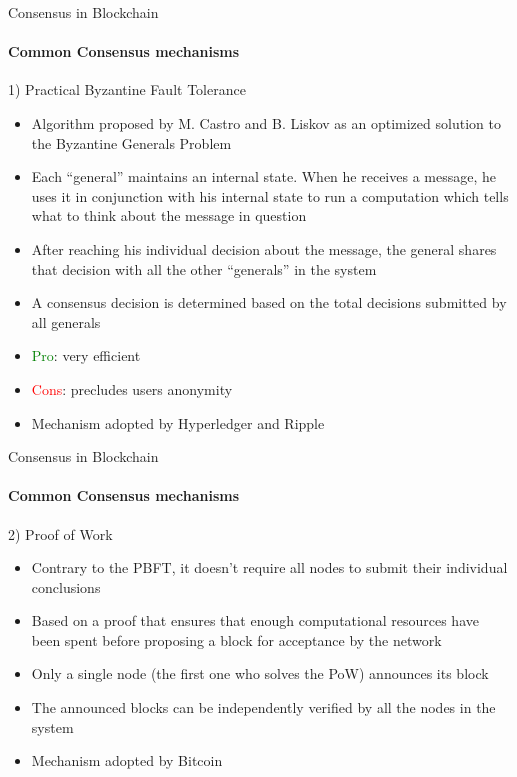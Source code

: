 \documentclass{beamer}
\newcommand\red[1]{\textcolor{red}{#1}}
\begin{document}
  \begin{frame}{Consensus in Blockchain}
    \framesubtitle{Common Consensus mechanisms}
    \begin{block}{1) Practical Byzantine Fault Tolerance}
      \begin{itemize}
        \item Algorithm proposed by M. Castro and B. Liskov as an optimized
        solution to the Byzantine Generals Problem \cite{castro1999practical} 
        \item Each “general” maintains an internal state. When he receives a
        message, he uses it in conjunction with his internal state to
        run a computation which tells what to think about the message in question 
        \item  After reaching his individual decision about the message,
        the general shares that decision with all the other “generals” in the system 
        \item  A consensus decision is determined based on the total decisions
        submitted by all generals \pause
        \item \textcolor{green}{Pro}: very efficient \pause
        \item \red{Cons}: precludes users anonymity \pause
        \item Mechanism adopted by Hyperledger and Ripple
      \end{itemize}
    \end{block}
  \end{frame}




  \begin{frame}{Consensus in Blockchain}
    \framesubtitle{Common Consensus mechanisms}
    \begin{block}{2) Proof of Work}
      \begin{itemize}
        \item Contrary to the PBFT, it doesn’t require all nodes to submit
        their individual conclusions 
        \item Based on a proof that ensures that enough computational resources have
        been spent before proposing a block for acceptance by the network 
        \item Only a single node (the first one who solves the PoW) announces its
        block 
        \item The announced blocks can be independently verified by all
        the nodes in the system \pause
        \item Mechanism adopted by Bitcoin
      \end{itemize}
    \end{block}
  \end{frame}
\end{document}
